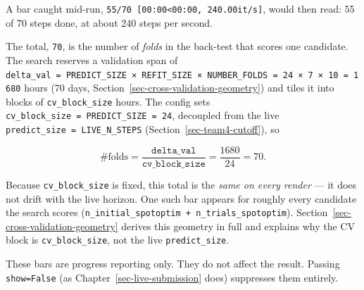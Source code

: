 \documentclass[
  english,
  letterpaper,
]{scrbook}
\begin{document}
\begin{tcolorbox}
A bar caught mid-run,
\texttt{55/70\ {[}00:00\textless{}00:00,\ 240.00it/s{]}}, would then
read: 55 of 70 steps done, at about 240 steps per second.

The total, \texttt{70}, is the number of \emph{folds} in the back-test
that scores one candidate. The search reserves a validation span of
\texttt{delta\_val\ =\ PREDICT\_SIZE\ ×\ REFIT\_SIZE\ ×\ NUMBER\_FOLDS\ =\ 24\ ×\ 7\ ×\ 10\ =\ 1680}
hours (70 days, Section~\ref{sec-cross-validation-geometry}) and tiles
it into blocks of \texttt{cv\_block\_size} hours. The config sets
\texttt{cv\_block\_size\ =\ PREDICT\_SIZE\ =\ 24}, decoupled from the
live \texttt{predict\_size\ =\ LIVE\_N\_STEPS}
(Section~\ref{sec-team4-cutoff}), so

\[
\#\text{folds} = \frac{\texttt{delta\_val}}{\texttt{cv\_block\_size}}
              = \frac{1680}{24} = 70 .
\]

Because \texttt{cv\_block\_size} is fixed, this total is the \emph{same
on every render} --- it does not drift with the live horizon. One such
bar appears for roughly every candidate the search scores
(\texttt{n\_initial\_spotoptim\ +\ n\_trials\_spotoptim}).
Section~\ref{sec-cross-validation-geometry} derives this geometry in
full and explains why the CV block is \texttt{cv\_block\_size}, not the
live \texttt{predict\_size}.

These bars are progress reporting only. They do not affect the result.
Passing \texttt{show=False} (as Chapter~\ref{sec-live-submission} does)
suppresses them entirely.

\end{tcolorbox}
\end{document}
